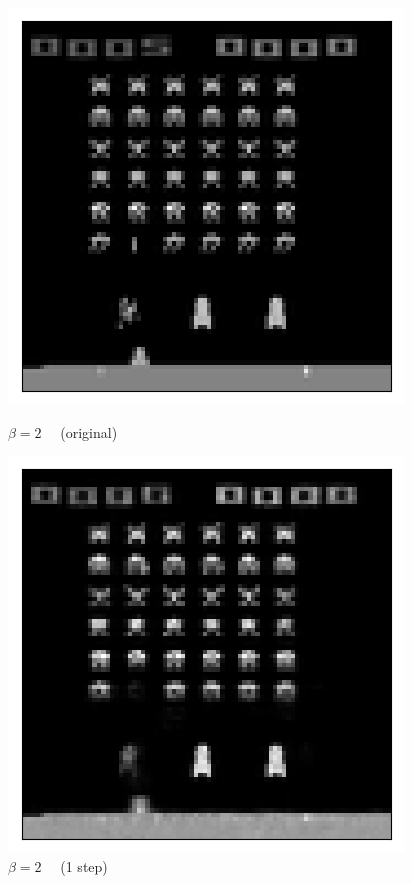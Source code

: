 \begin{figure}[h!]
\begin{multicols}{4}
    \includegraphics[scale=0.4]{figures/results/indiscriminate_decoupling/beta_2_posterior_sample_original.png}
    \caption{$\beta=2\quad$ (original)}
    \includegraphics[scale=0.4]{figures/results/indiscriminate_decoupling/beta_2_posterior_sample_0.png}
    \caption{$\beta=2\quad$ (1 step)}

\end{multicols}
\end{figure}
